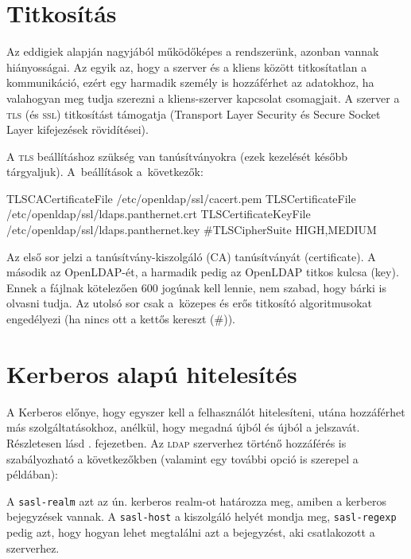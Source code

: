 \section{Titkosítás}

Az eddigiek alapján nagyjából működőképes a rendszerünk, azonban vannak
hiányosságai. Az egyik az, hogy a szerver és a kliens között titkosítatlan a kommunikáció, ezért egy harmadik személy
is hozzáférhet az adatokhoz, ha valahogyan meg tudja szerezni a kliens-szerver kapcsolat csomagjait. A szerver a \textsc{tls}
(és \textsc{ssl}) titkosítást támogatja (Transport Layer Security és Secure Socket Layer kifejezések rövidítései).

A \textsc{tls} beállításhoz szükség van tanúsítványokra (ezek kezelését később tárgyaljuk). A~beállítások a~következők:

\begin{VerbExample}
TLSCACertificateFile /etc/openldap/ssl/cacert.pem
TLSCertificateFile /etc/openldap/ssl/ldaps.panthernet.crt
TLSCertificateKeyFile /etc/openldap/ssl/ldaps.panthernet.key
#TLSCipherSuite HIGH,MEDIUM
\end{VerbExample}  

Az első sor jelzi a tanúsítvány-kiszolgáló (CA) tanúsítványát (certificate). A második az OpenLDAP-ét, a harmadik pedig
az OpenLDAP titkos kulcsa (key). Ennek a fájlnak kötelezően 600 jogúnak kell lennie, nem szabad, hogy bárki is olvasni
tudja. Az utolsó sor csak a~közepes és erős titkosító algoritmusokat engedélyezi (ha nincs ott a kettős kereszt (\#)).






\section{Kerberos alapú hitelesítés}

A Kerberos előnye, hogy egyszer kell a felhasználót hitelesíteni, utána hozzáférhet más szolgáltatásokhoz, anélkül, hogy
megadná újból és újból a jelszavát. Részletesen lásd . fejezetben. Az \textsc{ldap} szerverhez történő
hozzáférés is szabályozható a következőkben (valamint egy további opció is szerepel a példában):


A \texttt{sasl-realm} azt az ún. kerberos realm-ot határozza meg, amiben a kerberos bejegyzések vannak. A
\texttt{sasl-host} a kiszolgáló helyét mondja meg, \texttt{sasl-regexp} pedig azt, hogy hogyan lehet megtalálni azt a
bejegyzést, aki csatlakozott a szerverhez.

